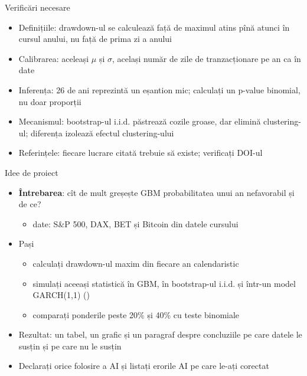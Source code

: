 \begin{frame}{Verificări necesare}
\itemsize{\small}
\begin{itemize}
    \item Definițiile: drawdown-ul se calculează față de maximul atins pînă atunci în cursul anului, nu față de prima zi a anului
    \item Calibrarea: aceleași $\mu$ și $\sigma$, același număr de zile de tranzacționare pe an ca în date
    \item Inferența: 26 de ani reprezintă un eșantion mic; calculați un p-value binomial, nu doar proporții
    \item Mecanismul: bootstrap-ul i.i.d. păstrează cozile groase, dar elimină clustering-ul; diferența izolează efectul clustering-ului
    \item Referințele: fiecare lucrare citată trebuie să existe; verificați DOI-ul
\end{itemize}
\end{frame}

\begin{frame}{Idee de proiect}
\itemsize{\small}
\begin{itemize}
    \item \textbf{Întrebarea}: cît de mult greșește GBM probabilitatea unui an nefavorabil și de ce?
    \begin{itemize}
        \item date: S\&P 500, DAX, BET și Bitcoin din datele cursului
    \end{itemize}
    \item Pași
    \begin{itemize}
        \item calculați drawdown-ul maxim din fiecare an calendaristic
        \item simulați aceeași statistică în GBM, în bootstrap-ul i.i.d. și într-un model GARCH(1,1) ()
        \item comparați ponderile peste 20\% și 40\% cu teste binomiale
    \end{itemize}
    \item Rezultat: un tabel, un grafic și un paragraf despre concluziile pe care datele le susțin și pe care nu le susțin
    \item Declarați orice folosire a AI și listați erorile AI pe care le-ați corectat 
\end{itemize}
\end{frame}


